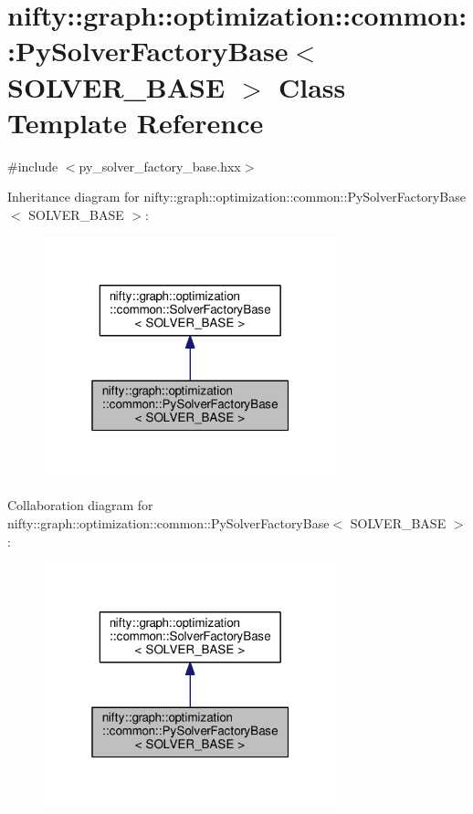 \hypertarget{classnifty_1_1graph_1_1optimization_1_1common_1_1PySolverFactoryBase}{}\section{nifty\+:\+:graph\+:\+:optimization\+:\+:common\+:\+:Py\+Solver\+Factory\+Base$<$ S\+O\+L\+V\+E\+R\+\_\+\+B\+A\+S\+E $>$ Class Template Reference}
\label{classnifty_1_1graph_1_1optimization_1_1common_1_1PySolverFactoryBase}


{\ttfamily \#include $<$py\+\_\+solver\+\_\+factory\+\_\+base.\+hxx$>$}



Inheritance diagram for nifty\+:\+:graph\+:\+:optimization\+:\+:common\+:\+:Py\+Solver\+Factory\+Base$<$ S\+O\+L\+V\+E\+R\+\_\+\+B\+A\+S\+E $>$\+:\nopagebreak
\begin{figure}[H]
\begin{center}
\leavevmode
\includegraphics[width=241pt]{classnifty_1_1graph_1_1optimization_1_1common_1_1PySolverFactoryBase__inherit__graph}
\end{center}
\end{figure}


Collaboration diagram for nifty\+:\+:graph\+:\+:optimization\+:\+:common\+:\+:Py\+Solver\+Factory\+Base$<$ S\+O\+L\+V\+E\+R\+\_\+\+B\+A\+S\+E $>$\+:\nopagebreak
\begin{figure}[H]
\begin{center}
\leavevmode
\includegraphics[width=241pt]{classnifty_1_1graph_1_1optimization_1_1common_1_1PySolverFactoryBase__coll__graph}
\end{center}
\end{figure}
